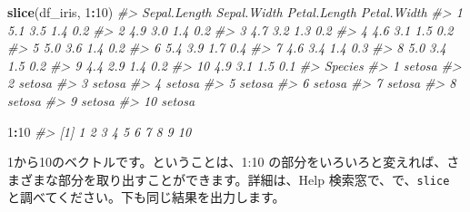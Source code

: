 \documentclass[
  xelatex, ja=standard]{bxjsbook}
\newenvironment{Shaded}{\begin{snugshade}}{\end{snugshade}}
\newcommand{\CommentTok}[1]{\textcolor[rgb]{0.56,0.35,0.01}{\textit{#1}}}
\newcommand{\DecValTok}[1]{\textcolor[rgb]{0.00,0.00,0.81}{#1}}
\newcommand{\FunctionTok}[1]{\textcolor[rgb]{0.13,0.29,0.53}{\textbf{#1}}}
\newcommand{\NormalTok}[1]{#1}
\newcommand{\SpecialCharTok}[1]{\textcolor[rgb]{0.81,0.36,0.00}{\textbf{#1}}}
\theoremstyle{definition}
\theoremstyle{definition}
\theoremstyle{definition}
\theoremstyle{definition}
\theoremstyle{remark}
\begin{document}
\begin{Shaded}
\begin{Highlighting}[]
\FunctionTok{slice}\NormalTok{(df\_iris, }\DecValTok{1}\SpecialCharTok{:}\DecValTok{10}\NormalTok{)}
\CommentTok{\#\textgreater{}    Sepal.Length Sepal.Width Petal.Length Petal.Width}
\CommentTok{\#\textgreater{} 1           5.1         3.5          1.4         0.2}
\CommentTok{\#\textgreater{} 2           4.9         3.0          1.4         0.2}
\CommentTok{\#\textgreater{} 3           4.7         3.2          1.3         0.2}
\CommentTok{\#\textgreater{} 4           4.6         3.1          1.5         0.2}
\CommentTok{\#\textgreater{} 5           5.0         3.6          1.4         0.2}
\CommentTok{\#\textgreater{} 6           5.4         3.9          1.7         0.4}
\CommentTok{\#\textgreater{} 7           4.6         3.4          1.4         0.3}
\CommentTok{\#\textgreater{} 8           5.0         3.4          1.5         0.2}
\CommentTok{\#\textgreater{} 9           4.4         2.9          1.4         0.2}
\CommentTok{\#\textgreater{} 10          4.9         3.1          1.5         0.1}
\CommentTok{\#\textgreater{}    Species}
\CommentTok{\#\textgreater{} 1   setosa}
\CommentTok{\#\textgreater{} 2   setosa}
\CommentTok{\#\textgreater{} 3   setosa}
\CommentTok{\#\textgreater{} 4   setosa}
\CommentTok{\#\textgreater{} 5   setosa}
\CommentTok{\#\textgreater{} 6   setosa}
\CommentTok{\#\textgreater{} 7   setosa}
\CommentTok{\#\textgreater{} 8   setosa}
\CommentTok{\#\textgreater{} 9   setosa}
\CommentTok{\#\textgreater{} 10  setosa}
\end{Highlighting}
\end{Shaded}

\begin{Shaded}
\begin{Highlighting}[]
\DecValTok{1}\SpecialCharTok{:}\DecValTok{10}
\CommentTok{\#\textgreater{}  [1]  1  2  3  4  5  6  7  8  9 10}
\end{Highlighting}
\end{Shaded}

1から10のベクトルです。ということは、1:10 の部分をいろいろと変えれば、さまざまな部分を取り出すことができます。詳細は、Help 検索窓で、で、\texttt{slice} と調べてください。下も同じ結果を出力します。
\end{document}
